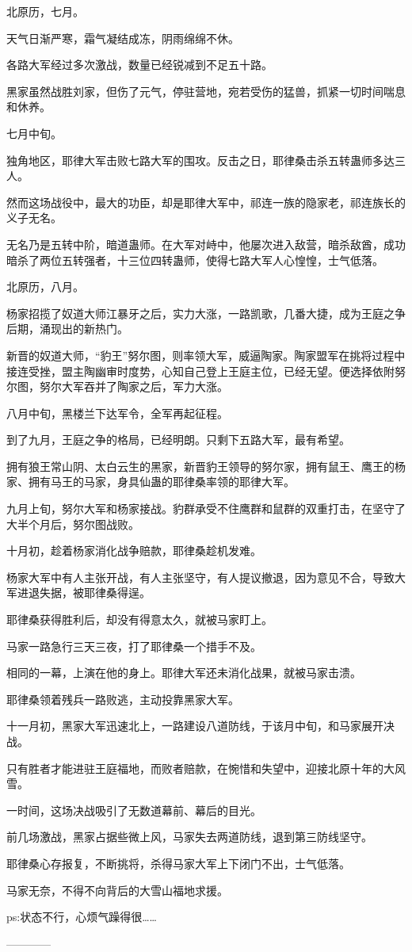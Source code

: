 \begin{this_body}
北原历，七月。

天气日渐严寒，霜气凝结成冻，阴雨绵绵不休。

各路大军经过多次激战，数量已经锐减到不足五十路。

黑家虽然战胜刘家，但伤了元气，停驻营地，宛若受伤的猛兽，抓紧一切时间喘息和休养。

七月中旬。

独角地区，耶律大军击败七路大军的围攻。反击之日，耶律桑击杀五转蛊师多达三人。

然而这场战役中，最大的功臣，却是耶律大军中，祁连一族的隐家老，祁连族长的义子无名。

无名乃是五转中阶，暗道蛊师。在大军对峙中，他屡次进入敌营，暗杀敌酋，成功暗杀了两位五转强者，十三位四转蛊师，使得七路大军人心惶惶，士气低落。

北原历，八月。

杨家招揽了奴道大师江暴牙之后，实力大涨，一路凯歌，几番大捷，成为王庭之争后期，涌现出的新热门。

新晋的奴道大师，“豹王”努尔图，则率领大军，威逼陶家。陶家盟军在挑将过程中接连受挫，盟主陶幽审时度势，心知自己登上王庭主位，已经无望。便选择依附努尔图，努尔大军吞并了陶家之后，军力大涨。

八月中旬，黑楼兰下达军令，全军再起征程。

到了九月，王庭之争的格局，已经明朗。只剩下五路大军，最有希望。

拥有狼王常山阴、太白云生的黑家，新晋豹王领导的努尔家，拥有鼠王、鹰王的杨家、拥有马王的马家，身具仙蛊的耶律桑率领的耶律大军。

九月上旬，努尔大军和杨家接战。豹群承受不住鹰群和鼠群的双重打击，在坚守了大半个月后，努尔图战败。

十月初，趁着杨家消化战争赔款，耶律桑趁机发难。

杨家大军中有人主张开战，有人主张坚守，有人提议撤退，因为意见不合，导致大军进退失据，被耶律桑得逞。

耶律桑获得胜利后，却没有得意太久，就被马家盯上。

马家一路急行三天三夜，打了耶律桑一个措手不及。

相同的一幕，上演在他的身上。耶律大军还未消化战果，就被马家击溃。

耶律桑领着残兵一路败逃，主动投靠黑家大军。

十一月初，黑家大军迅速北上，一路建设八道防线，于该月中旬，和马家展开决战。

只有胜者才能进驻王庭福地，而败者赔款，在惋惜和失望中，迎接北原十年的大风雪。

一时间，这场决战吸引了无数道幕前、幕后的目光。

前几场激战，黑家占据些微上风，马家失去两道防线，退到第三防线坚守。

耶律桑心存报复，不断挑将，杀得马家大军上下闭门不出，士气低落。

马家无奈，不得不向背后的大雪山福地求援。

ps:状态不行，心烦气躁得很……

------------

\end{this_body}


